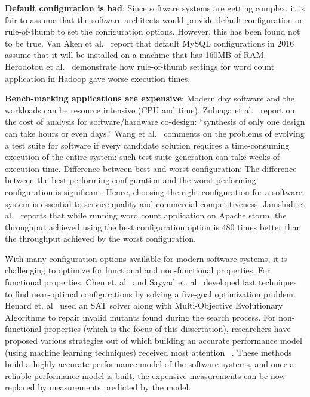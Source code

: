 \documentclass[sigconf]{acmart}
\begin{document}
\textbf{Default configuration is bad}: Since software systems are
getting complex, it is fair to assume that the software
architects would provide default configuration or rule-of-thumb to set the configuration options. However, this has
been found not to be true. Van Aken et al.~\cite{van2017automatic} report that
default MySQL configurations in 2016 assume that it will be
installed on a machine that has 160MB of RAM. Herodotou
et al.~\cite{herodotou2011starfish} demonstrate how rule-of-thumb settings for word
count application in Hadoop gave worse execution times.


\textbf{Bench-marking applications are expensive}: Modern day software and the workloads can be resource intensive (CPU and time). Zuluaga et al.~\cite{zuluaga2013active} report on the cost of analysis for software/hardware co-design: “synthesis of only one design can take hours or even days.” Wang et al.~\cite{wang2013searching}
comments on the problems of evolving a test suite for software
if every candidate solution requires a time-consuming
execution of the entire system: such test suite generation can
take weeks of execution time.
Difference between best and worst configuration: The
difference between the best performing configuration and the worst performing configuration is significant. Hence,
choosing the right configuration for a software system is
essential to service quality and commercial competitiveness.
Jamshidi et al.~\cite{jamshidi2016uncertainty} reports that while running word count
application on Apache storm, the throughput achieved using the best configuration option is 480 times better than
the throughput achieved by the worst configuration.

With many configuration options available for modern
software systems, it is challenging to optimize for functional
and non-functional properties. For functional properties,
Chen et. al~\cite{chen2016sampling} and Sayyad et. al~\cite{sayyad2013scalable} developed fast techniques
to find near-optimal configurations by solving a five-goal optimization problem. Henard et. al~\cite{henard2015combining} used an SAT
solver along with Multi-Objective Evolutionary Algorithms
to repair invalid mutants found during the search process.
For non-functional properties (which is the focus of this dissertation), researchers have proposed
various strategies out of which building an accurate performance
model (using machine learning techniques) received
most attention ~\cite{guo2013variability, sarkar2015cost, siegmund2012predicting}. These methods build a highly accurate performance model of the software systems, and once a reliable performance model is built, the expensive measurements can be now replaced by measurements predicted by the model. 
\end{document}

